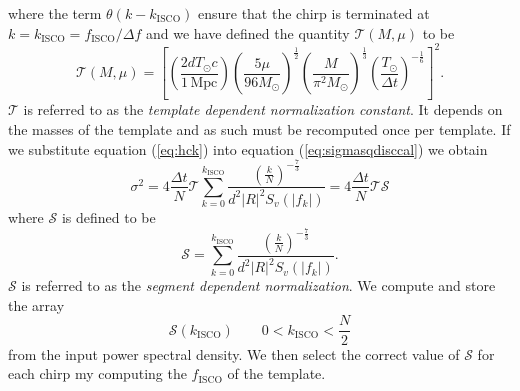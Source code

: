 where the term $\theta\left(k-k_\mathrm{ISCO}\right)$ ensure that the chirp is
terminated at $k = k_\mathrm{ISCO} = f_\mathrm{ISCO} / \Delta f$ and we have 
defined the quantity $\mathcal{T}(M,\mu)$ to be
\begin{equation}
\mathcal{T}(M,\mu) = \left[
\left(\frac{2dT_\odot c}{1\,\mathrm{Mpc}}\right)
\left(\frac{5\mu}{96M_\odot}\right)^\frac{1}{2}
\left(\frac{M}{\pi^2M_\odot}\right)^\frac{1}{3}
\left(\frac{T_\odot}{\Delta t}\right)^{-\frac{1}{6}}
\right]^2.
\end{equation}
$\mathcal{T}$ is referred to as the \emph{template dependent normalization
constant}. It depends on the masses of the template and as such must be
recomputed once per template. If we substitute equation (\ref{eq:hck}) 
into equation (\ref{eq:sigmasqdisccal}) we obtain
\begin{equation}
\sigma^2 = 4 \frac{\Delta t}{N} \mathcal{T} 
\sum_{k=0}^{k_\mathrm{ISCO}} 
\frac{\left(\frac{k}{N}\right)^{-\frac{7}{3}}}
{d^2|R|^2S_v\left(\left|f_k\right|\right)}
= 4 \frac{\Delta t}{N} \mathcal{T} \mathcal{S}
\end{equation}
where $\mathcal{S}$ is defined to be
\begin{equation}
\mathcal{S} = 
\sum_{k=0}^{k_\mathrm{ISCO}} 
\frac{\left(\frac{k}{N}\right)^{-\frac{7}{3}}}{d^2|R|^2S_v\left(\left|f_k\right|\right)}.
\end{equation}
$\mathcal{S}$ is referred to as the \emph{segment dependent normalization}.
We compute and store the array 
\begin{equation}
\mathcal{S}(k_\mathrm{ISCO}) \quad \quad 0 < k_\mathrm{ISCO} < \frac{N}{2}
\end{equation}
from the input power spectral density. We then select the correct value of
$\mathcal{S}$ for each chirp my computing the $f_\mathrm{ISCO}$ of the
template.

